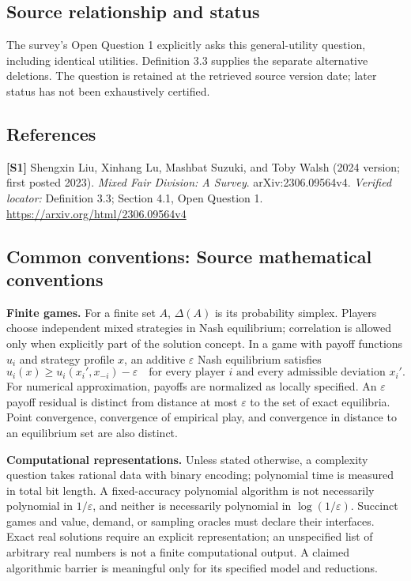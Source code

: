 \documentclass[11pt,a4paper]{article}
\begin{document}
\subsection*{Source relationship and status}
The survey's Open Question 1 explicitly asks this general-utility question, including identical utilities. Definition 3.3 supplies the separate alternative deletions. The question is retained at the retrieved source version date; later status has not been exhaustively certified.
\subsection*{References}
\begingroup\footnotesize\raggedright
\textbf{[S1]} Shengxin Liu, Xinhang Lu, Mashbat Suzuki, and Toby Walsh (2024 version; first posted 2023). \emph{Mixed Fair Division: A Survey}. arXiv:2306.09564v4. \textit{Verified locator:} Definition 3.3; Section 4.1, Open Question 1. \url{https://arxiv.org/html/2306.09564v4}
\par\endgroup

\subsection*{Common conventions: Source mathematical conventions}

\textbf{Finite games.} For a finite set $A$, $\Delta(A)$ is its probability
simplex. Players choose independent mixed strategies in Nash equilibrium;
correlation is allowed only when explicitly part of the solution concept.
In a game with payoff functions $u_i$ and strategy profile $x$, an additive
$\varepsilon$ Nash equilibrium satisfies
\[
 u_i(x)\geq u_i(x_i',x_{-i})-\varepsilon
 \quad\text{for every player $i$ and every admissible deviation $x_i'$}.
\]
For numerical approximation, payoffs are normalized as locally specified.
An $\varepsilon$ payoff residual is distinct from distance at most
$\varepsilon$ to the set of exact equilibria. Point convergence, convergence
of empirical play, and convergence in distance to an equilibrium set are
also distinct.

\textbf{Computational representations.} Unless stated otherwise, a complexity
question takes rational data with binary encoding; polynomial time is measured
in total bit length. A fixed-accuracy polynomial algorithm is not necessarily
polynomial in $1/\varepsilon$, and neither is necessarily polynomial in
$\log(1/\varepsilon)$. Succinct games and value, demand, or sampling oracles
must declare their interfaces. Exact real solutions require an explicit
representation; an unspecified list of arbitrary real numbers is not a
finite computational output. A claimed algorithmic barrier is meaningful
only for its specified model and reductions.
\end{document}

